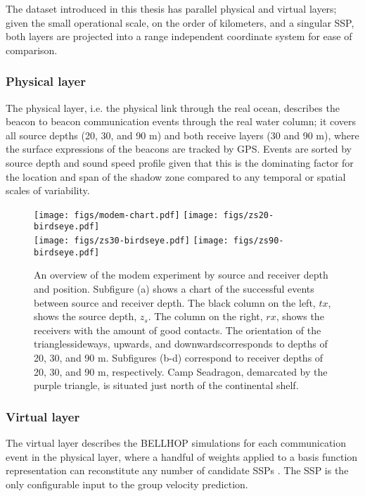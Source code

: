 The dataset introduced in this thesis has parallel physical and virtual layers; given the small operational scale, on the order of kilometers, and a singular SSP, both layers are projected into a range independent coordinate system for ease of comparison.

\subsubsection{Physical layer}
The physical layer, i.e. the physical link through the real ocean, describes the beacon to beacon communication events through the real water column; it covers all source depths (20, 30, and 90 m) and both receive layers (30 and 90 m), where the surface expressions of the beacons are tracked by GPS. Events are sorted by source depth and sound speed profile given that this is the dominating factor for the location and span of the shadow zone compared to any temporal or spatial scales of variability.


\begin{figure}[h!]
  \centering
  \texttt{[image: figs/modem-chart.pdf]} \hfill
  \texttt{[image: figs/zs20-birdseye.pdf]} \\
  \vspace{1em}
  \texttt{[image: figs/zs30-birdseye.pdf]} \hfill
  \texttt{[image: figs/zs90-birdseye.pdf]} \\
  \caption{An overview of the modem experiment by source and receiver depth and position. Subfigure (a) shows a chart of the successful events between source and receiver depth. The black column on the left, $tx$, shows the source depth, $z_s$. The column on the right, $rx$, shows the receivers with the amount of good contacts. The orientation of the triangles\textemdash sideways, upwards, and downwards\textemdash corresponds to depths of 20, 30, and 90 m. Subfigures (b-d) correspond to receiver depths of 20, 30, and 90 m, respectively. Camp Seadragon, demarcated by the purple triangle, is situated just north of the continental shelf.}
  \label{fig:overview}
  \end{figure}

\clearpage

\subsubsection{Virtual layer}
The virtual layer describes the BELLHOP simulations for each communication event in the physical layer, where a handful of weights applied to a basis function representation can reconstitute any number of candidate SSPs \citep{bhatt_embedded_2021}.
The SSP is the only configurable input to the group velocity prediction.

